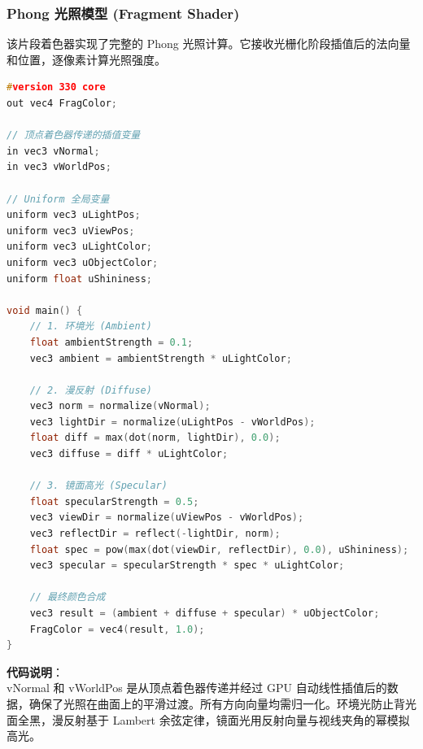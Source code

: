 \documentclass[a4paper]{article}
\begin{document}
\subsubsection{Phong 光照模型 (Fragment Shader)}
该片段着色器实现了完整的 Phong 光照计算。它接收光栅化阶段插值后的法向量和位置，逐像素计算光照强度。
\begin{lstlisting}[language=C++,caption={Phong Fragment Shader}]
#version 330 core
out vec4 FragColor;

// 顶点着色器传递的插值变量
in vec3 vNormal;
in vec3 vWorldPos;

// Uniform 全局变量
uniform vec3 uLightPos;
uniform vec3 uViewPos;
uniform vec3 uLightColor;
uniform vec3 uObjectColor;
uniform float uShininess;

void main() {
    // 1. 环境光 (Ambient)
    float ambientStrength = 0.1;
    vec3 ambient = ambientStrength * uLightColor;

    // 2. 漫反射 (Diffuse)
    vec3 norm = normalize(vNormal);
    vec3 lightDir = normalize(uLightPos - vWorldPos);
    float diff = max(dot(norm, lightDir), 0.0);
    vec3 diffuse = diff * uLightColor;

    // 3. 镜面高光 (Specular)
    float specularStrength = 0.5;
    vec3 viewDir = normalize(uViewPos - vWorldPos);
    vec3 reflectDir = reflect(-lightDir, norm);
    float spec = pow(max(dot(viewDir, reflectDir), 0.0), uShininess);
    vec3 specular = specularStrength * spec * uLightColor;

    // 最终颜色合成
    vec3 result = (ambient + diffuse + specular) * uObjectColor;
    FragColor = vec4(result, 1.0);
}
\end{lstlisting}
\textbf{代码说明}：\\
vNormal 和 vWorldPos 是从顶点着色器传递并经过 GPU 自动线性插值后的数据，确保了光照在曲面上的平滑过渡。所有方向向量均需归一化。环境光防止背光面全黑，漫反射基于 Lambert 余弦定律，镜面光用反射向量与视线夹角的幂模拟高光。
\end{document}

